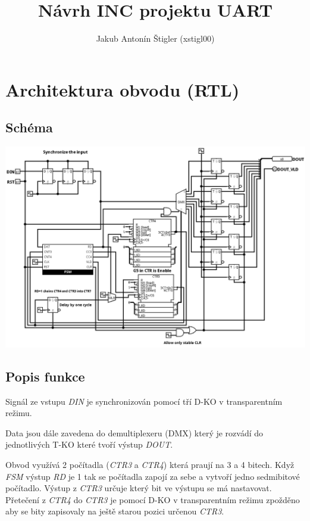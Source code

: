 \documentclass{article}
\title{Návrh INC projektu UART}
\author{Jakub Antonín Štigler (xstigl00)}
\begin{document}
\maketitle


\section{Architektura obvodu (RTL)}

\subsection{Schéma}
\includegraphics*[scale=0.4]{assets/RTL.png}

\subsection{Popis funkce}

Signál ze vstupu \emph{DIN} je synchronizován pomocí tří D-KO v transparentním
režimu.

Data jsou dále zavedena do demultiplexeru (DMX) který je rozvádí do
jednotlivých T-KO které tvoří výstup \emph{DOUT}.

Obvod využívá 2 počítadla (\emph{CTR3} a \emph{CTR4}) která praují na 3 a 4
bitech. Když \emph{FSM} výstup \emph{RD} je 1 tak se počítadla zapojí za sebe a
vytvoří jedno sedmibitové počítadlo. Výstup z \emph{CTR3} určuje který bit ve
výstupu se má nastavovat. Přetečení z \emph{CTR4} do \emph{CTR3} je pomocí D-KO
v transparentním režimu zpožděno aby se bity zapisovaly na ještě starou pozici
určenou \emph{CTR3}.
\end{document}

